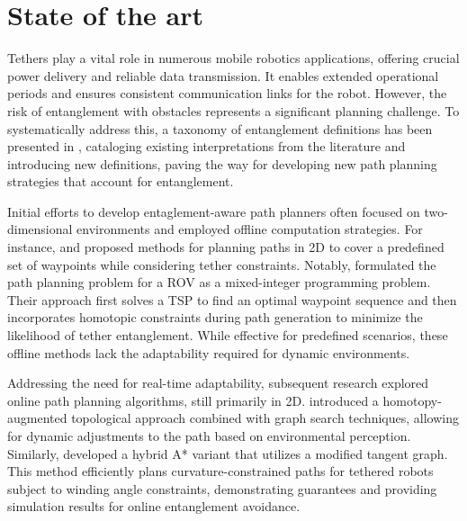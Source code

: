 \section{State of the art}
\label{sec:related_work}

Tethers play a vital role in numerous mobile robotics applications, offering crucial power delivery and reliable data transmission. It enables extended operational periods and ensures consistent communication links for the robot. However, the risk of entanglement with obstacles represents a significant planning challenge. To systematically address this, a taxonomy of entanglement definitions has been presented in \cite{definitions}, cataloging existing interpretations from the literature and introducing new definitions, paving the way for developing new path planning strategies that account for entanglement.

Initial efforts to develop entaglement-aware path planners often focused on two-dimensional environments and employed offline computation strategies. For instance, \cite{rov_mccammon} and \cite{mechsy2017novel} proposed methods for planning paths in 2D to cover a predefined set of waypoints while considering tether constraints. Notably, \cite{mechsy2017novel} formulated the path planning problem for a \ac{ROV} as a mixed-integer programming problem. Their approach first solves a \ac{TSP} to find an optimal waypoint sequence and then incorporates homotopic constraints during path generation to minimize the likelihood of tether entanglement. While effective for predefined scenarios, these offline methods lack the adaptability required for dynamic environments.

Addressing the need for real-time adaptability, subsequent research explored online path planning algorithms, still primarily in 2D. \cite{kim} introduced a homotopy-augmented topological approach combined with graph search techniques, allowing for dynamic adjustments to the path based on environmental perception. Similarly, \cite{withy} developed a hybrid A* variant that utilizes a modified tangent graph. This method efficiently plans curvature-constrained paths for tethered robots subject to winding angle constraints, demonstrating guarantees and providing simulation results for online entanglement avoidance. %

